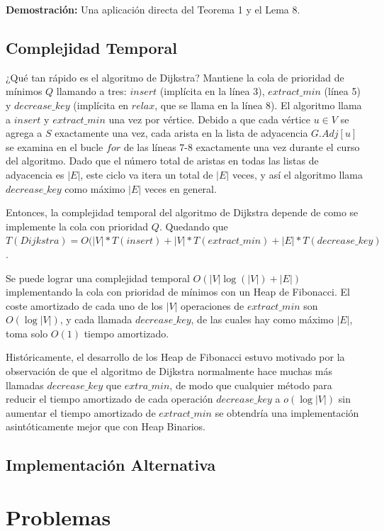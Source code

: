 \documentclass[12pt]{article}
\newcommand{\proof}{\textbf{Demostración:} }
\newcommand{\nl}{\vspace{0.3cm}}
\begin{document}
\proof Una aplicación directa del Teorema 1 y el Lema 8.

\subsection{Complejidad Temporal}

¿Qué tan rápido es el algoritmo de Dijkstra? Mantiene la cola de prioridad de mínimos $Q$ llamando a tres: $insert$ (implícita en la línea 3), $extract\_min$ (línea 5) y $decrease\_key$ (implícita en $relax$, que se llama en la línea 8). El algoritmo llama a $insert$ y $extract\_min$ una vez por vértice. Debido a que cada vértice $u \in V$ se agrega a $S$ exactamente una vez, cada arista en la lista de adyacencia $G.Adj [u]$ se examina en el bucle $for$ de las líneas 7-8 exactamente una vez durante el curso del algoritmo. Dado que el número total de aristas en todas las listas de adyacencia es $|E|$, este ciclo va itera un total de $|E|$ veces, y así el algoritmo llama $decrease\_key$ como máximo $|E|$ veces en general.

\nl

Entonces, la complejidad temporal del algoritmo de Dijkstra depende de como se implemente la cola con prioridad $Q$. Quedando que $T(Dijkstra) = O(|V| * T(insert) + |V| * T(extract\_min) + |E| * T(decrease\_key)$.

\nl

Se puede lograr una complejidad temporal  $O(|V| \log(|V|) + |E|)$ implementando la cola con prioridad de mínimos con un Heap de Fibonacci. El coste amortizado de cada uno de los $|V|$ operaciones de $extract\_min$ son $O(\log|V|)$, y cada llamada $decrease\_key$, de las cuales hay como máximo $|E|$, toma solo $O(1)$ tiempo amortizado.

\nl

Históricamente, el desarrollo de los Heap de Fibonacci estuvo motivado por la observación de que el algoritmo de Dijkstra normalmente hace muchas más llamadas $decrease\_key$ que $extra\_min$, de modo que cualquier método para reducir el tiempo amortizado de cada operación $decrease\_key$ a $o(\log|V|)$ sin aumentar el tiempo amortizado de $extract\_min$ se obtendría una implementación asintóticamente mejor que con Heap Binarios.

\subsection{Implementación Alternativa}



\section{Problemas}

\nocite{*}


\end{document}
